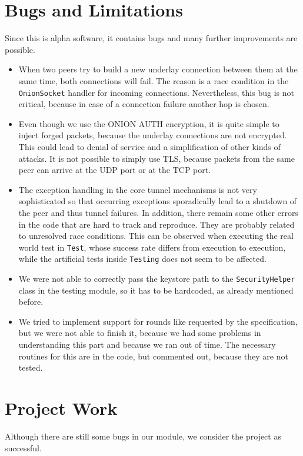 \documentclass{article}
\begin{document}
\section{Bugs and Limitations}
Since this is alpha software, it contains bugs and many further improvements are possible.
\begin{itemize}
\item When two peers try to build a new underlay connection between them at the same time, both connections will fail. The reason is a race condition in the \texttt{OnionSocket} handler for incoming connections. Nevertheless, this bug is not critical, because in case of a connection failure another hop is chosen.
\item Even though we use the ONION AUTH encryption, it is quite simple to inject forged packets, because the underlay connections are not encrypted. This could lead to denial of service and a simplification of other kinds of attacks. It is not possible to simply use TLS, because packets from the same peer can arrive at the UDP port or at the TCP port.
\item The exception handling in the core tunnel mechanisms is not very sophisticated so that occurring exceptions sporadically lead to a shutdown of the peer and thus tunnel failures. In addition, there remain some other errors in the code that are hard to track and reproduce. They are probably related to unresolved race conditions. This can be observed when executing the real world test in \texttt{Test}, whose success rate differs from execution to execution, while the artificial tests inside \texttt{Testing} does not seem to be affected.
\item We were not able to correctly pass the keystore path to the \texttt{SecurityHelper} class in the testing module, so it has to be hardcoded, as already mentioned before.
\item We tried to implement support for rounds like requested by the specification, but we were not able to finish it, because we had some problems in understanding this part and because we ran out of time. The necessary routines for this are in the code, but commented out, because they are not tested. 
\end{itemize}

\section{Project Work}
Although there are still some bugs in our module, we consider the project as successful.
\end{document}
